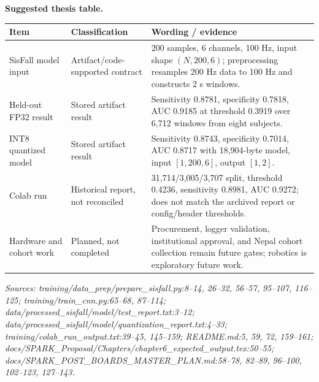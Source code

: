 \noindent\textbf{Suggested thesis table.}
\begin{tabular}{p{0.20\linewidth}p{0.26\linewidth}p{0.54\linewidth}}
\textbf{Item} & \textbf{Classification} & \textbf{Wording / evidence} \\
\hline
SisFall model input & Artifact/code-supported contract & 200 samples, 6 channels, 100 Hz, input shape $(N,200,6)$; preprocessing resamples 200 Hz data to 100 Hz and constructs 2 s windows. \\
Held-out FP32 result & Stored artifact result & Sensitivity 0.8781, specificity 0.7818, AUC 0.9185 at threshold 0.3919 over 6,712 windows from eight subjects. \\
INT8 quantized model & Stored artifact result & Sensitivity 0.8743, specificity 0.7014, AUC 0.8717 with 18,904-byte model, input \([1,200,6]\), output \([1,2]\). \\
Colab run & Historical report, not reconciled & 31,714/3,005/3,707 split, threshold 0.4236, sensitivity 0.8981, AUC 0.9272; does not match the archived report or config/header thresholds. \\
Hardware and cohort work & Planned, not completed & Procurement, logger validation, institutional approval, and Nepal cohort collection remain future gates; robotics is exploratory future work. \\
\end{tabular}
\textit{Sources: training/data\_prep/prepare\_sisfall.py:8--14, 26--32, 56--57, 95--107, 116--125; training/train\_cnn.py:65--68, 87--114; data/processed\_sisfall/model/test\_report.txt:3--12; data/processed\_sisfall/model/quantization\_report.txt:4--33; training/colab\_run\_output.txt:39--45, 145--159; README.md:5, 59, 72, 159--161; docs/SPARK\_Proposal/Chapters/chapter6\_expected\_output.tex:50--55; docs/SPARK\_POST\_BOARDS\_MASTER\_PLAN.md:58--78, 82--89, 96--100, 102--123, 127--143.}
